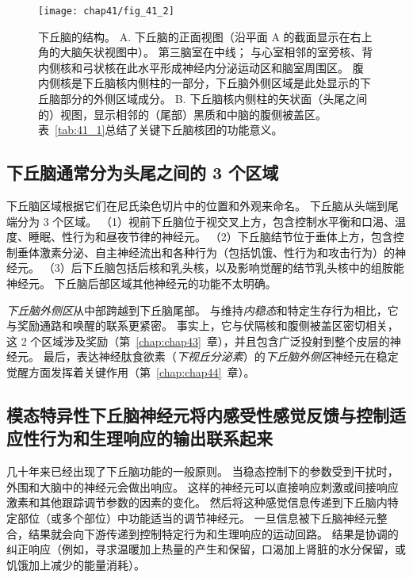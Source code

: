 \begin{figure}[htbp]
	\centering
	\texttt{[image: chap41/fig\_41\_2]}
	\caption{下丘脑的结构。
		A. 下丘脑的正面视图（沿平面 A 的截面显示在右上角的大脑矢状视图中）。
		第三脑室在中线；
		与心室相邻的室旁核、背内侧核和弓状核在此水平形成神经内分泌运动区和脑室周围区。
		腹内侧核是下丘脑核内侧柱的一部分，下丘脑外侧区域是此处显示的下丘脑部分的外侧区域成分。 
		B. 下丘脑核内侧柱的矢状面（头尾之间的）视图，显示相邻的（尾部）黑质和中脑的腹侧被盖区。
		表~\ref{tab:41_1}总结了关键下丘脑核团的功能意义。}
	\label{fig:41_2}
\end{figure}



\subsection{下丘脑通常分为头尾之间的 3 个区域}

下丘脑区域根据它们在尼氏染色切片中的位置和外观来命名。
下丘脑从头端到尾端分为 3 个区域。
（1）视前下丘脑位于视交叉上方，包含控制水平衡和口渴、温度、睡眠、性行为和昼夜节律的神经元。
（2）下丘脑结节位于垂体上方，包含控制垂体激素分泌、自主神经流出和各种行为（包括饥饿、性行为和攻击行为）的神经元。
（3）后下丘脑包括后核和乳头核，以及影响觉醒的结节乳头核中的组胺能神经元。
下丘脑后部区域其他神经元的功能不太明确。


\textit{下丘脑外侧区}从中部跨越到下丘脑尾部。
与维持\textit{内稳态}和特定生存行为相比，它与奖励通路和唤醒的联系更紧密。
事实上，它与伏隔核和腹侧被盖区密切相关，这 2 个区域涉及奖励（第~\ref{chap:chap43}~章），并且包含广泛投射到整个皮层的神经元。
最后，表达神经肽食欲素（\textit{下视丘分泌素}）的\textit{下丘脑外侧区}神经元在稳定觉醒方面发挥着关键作用（第~\ref{chap:chap44}~章）。



\subsection{模态特异性下丘脑神经元将内感受性感觉反馈与控制适应性行为和生理响应的输出联系起来}

几十年来已经出现了下丘脑功能的一般原则。
当稳态控制下的参数受到干扰时，外围和大脑中的神经元会做出响应。
这样的神经元可以直接响应刺激或间接响应激素和其他跟踪调节参数的因素的变化。
然后将这种感觉信息传递到下丘脑内特定部位（或多个部位）中功能适当的调节神经元。
一旦信息被下丘脑神经元整合，结果就会向下游传递到控制特定行为和生理响应的运动回路。
结果是协调的纠正响应（例如，寻求温暖加上热量的产生和保留，口渴加上肾脏的水分保留，或饥饿加上减少的能量消耗）。


